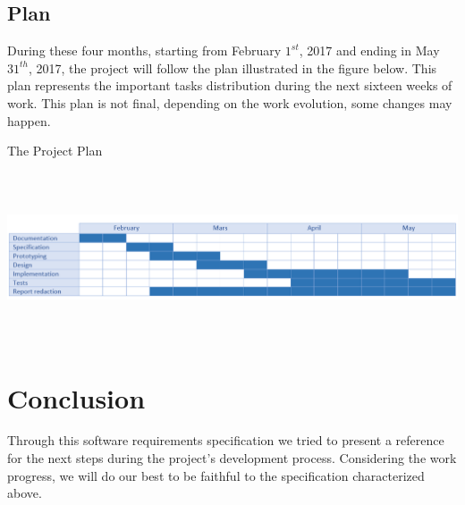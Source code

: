 \documentclass[a4paper]{report}
\begin{document}
\section{Plan}

During these four months, starting from February $1^{st}$, 2017 and ending in May $31^{th}$, 2017, the
project will follow the plan illustrated in the figure below. This plan represents the important tasks
distribution during the next sixteen weeks of work. This plan is not final, depending on the work evolution, some changes may happen.
\begin{table}[!h]
\begin{center}
\caption{The Project Plan}
\includegraphics[width=17cm,height=5cm]{Plan.png}
\end{center}

\end{table}
\chapter{Conclusion}
Through this software requirements specification we tried to present a reference for the next steps
during the project’s development process. Considering the work progress, we will do our best to be
faithful to the specification characterized above.
%

%

%
 
%

%

%

%

%

\newpage

\nocite{*}


%
\end{document}

